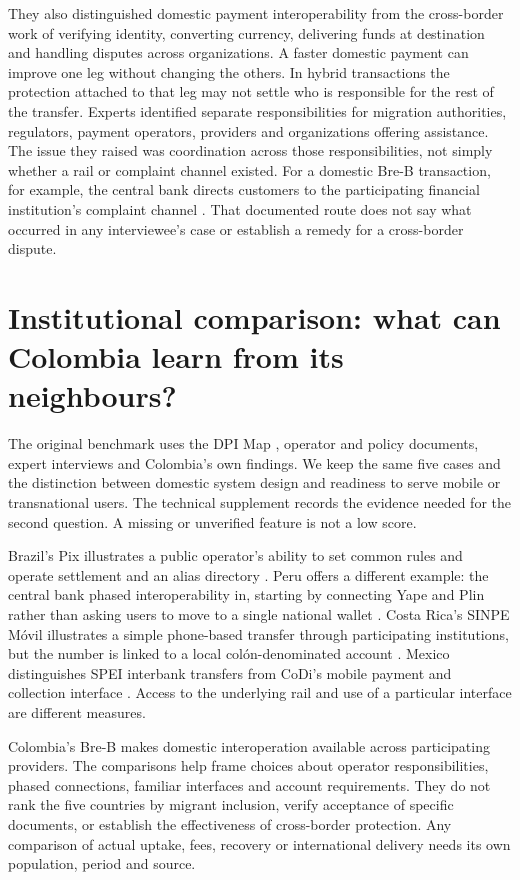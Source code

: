 \documentclass[12pt]{article}
\begin{document}
They also distinguished domestic payment interoperability from the cross-border work of verifying identity, converting currency, delivering funds at destination and handling disputes across organizations. A faster domestic payment can improve one leg without changing the others. In hybrid transactions the protection attached to that leg may not settle who is responsible for the rest of the transfer. Experts identified separate responsibilities for migration authorities, regulators, payment operators, providers and organizations offering assistance. The issue they raised was coordination across those responsibilities, not simply whether a rail or complaint channel existed. For a domestic Bre-B transaction, for example, the central bank directs customers to the participating financial institution's complaint channel \citep{banrepfaq}. That documented route does not say what occurred in any interviewee's case or establish a remedy for a cross-border dispute.

\section{Institutional comparison: what can Colombia learn from its neighbours?}
The original benchmark uses the DPI Map \citep{institute_for_innovation_and_public_purpose_ucl_dpi_2025}, operator and policy documents, expert interviews and Colombia's own findings. We keep the same five cases and the distinction between domestic system design and readiness to serve mobile or transnational users. The technical supplement records the evidence needed for the second question. A missing or unverified feature is not a low score.

Brazil's Pix illustrates a public operator's ability to set common rules and operate settlement and an alias directory \citep{bcbpix}. Peru offers a different example: the central bank phased interoperability in, starting by connecting Yape and Plin rather than asking users to move to a single national wallet \citep{bcrp2025}. Costa Rica's SINPE Móvil illustrates a simple phone-based transfer through participating institutions, but the number is linked to a local colón-denominated account \citep{bccrsinpe}. Mexico distinguishes SPEI interbank transfers from CoDi's mobile payment and collection interface \citep{banxicocodi,banxicospei}. Access to the underlying rail and use of a particular interface are different measures.

Colombia's Bre-B makes domestic interoperation available across participating providers. The comparisons help frame choices about operator responsibilities, phased connections, familiar interfaces and account requirements. They do not rank the five countries by migrant inclusion, verify acceptance of specific documents, or establish the effectiveness of cross-border protection. Any comparison of actual uptake, fees, recovery or international delivery needs its own population, period and source.
\end{document}
